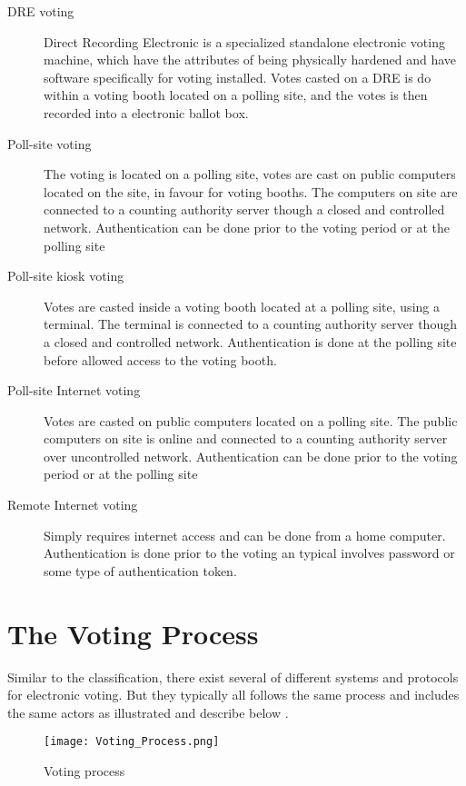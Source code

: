 \begin{description}
\item[DRE voting] Direct Recording Electronic is a specialized standalone electronic voting machine, which have the attributes of being physically hardened and have software specifically for voting installed. Votes casted on a DRE is do within a voting booth located on a polling site, and the votes is then recorded into a electronic ballot box.

\item[Poll-site voting] The voting is located on a polling site, votes are cast on public computers located on the site, in favour for voting booths. The computers on site are connected to a counting authority server though a closed and controlled network. Authentication can be done prior to the voting period or at the polling site

\item[Poll-site kiosk voting] Votes are casted inside a voting booth located at a polling site, using a terminal. The terminal is connected to a counting authority server though a closed and controlled network. Authentication is done at the polling site before allowed access to the voting booth. 

\item[Poll-site Internet voting] Votes are casted on public computers located on a polling site. The public computers on site is online and connected to a counting authority server over uncontrolled network. Authentication can be done prior to the voting period or at the polling site

\item[Remote Internet voting] Simply requires internet access and can be done from a home computer. Authentication is done prior to the voting an typical involves password or some type of authentication token. 

\end{description}


\section{The Voting Process}
Similar to the classification, there exist several of different systems and protocols for electronic voting. But they typically all follows the same process and includes the same actors as illustrated and describe below \cite{Cet09}. 

\begin{figure}[H]
\centering
\texttt{[image: Voting\_Process.png]}

\caption{Voting process}
\label{fig:Voting_Process}
\end{figure}

